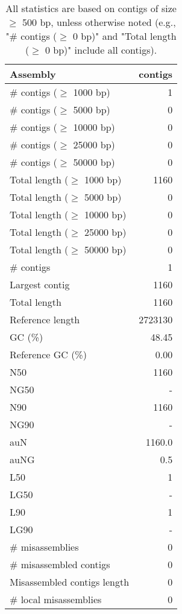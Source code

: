 \documentclass[12pt,a4paper]{article}
\begin{document}
\begin{table}[ht]
\begin{center}
\caption{All statistics are based on contigs of size $\geq$ 500 bp, unless otherwise noted (e.g., "\# contigs ($\geq$ 0 bp)" and "Total length ($\geq$ 0 bp)" include all contigs).}
\begin{tabular}{|l*{1}{|r}|}
\hline
Assembly & contigs \\ \hline
\# contigs ($\geq$ 1000 bp) & 1 \\ \hline
\# contigs ($\geq$ 5000 bp) & 0 \\ \hline
\# contigs ($\geq$ 10000 bp) & 0 \\ \hline
\# contigs ($\geq$ 25000 bp) & 0 \\ \hline
\# contigs ($\geq$ 50000 bp) & 0 \\ \hline
Total length ($\geq$ 1000 bp) & 1160 \\ \hline
Total length ($\geq$ 5000 bp) & 0 \\ \hline
Total length ($\geq$ 10000 bp) & 0 \\ \hline
Total length ($\geq$ 25000 bp) & 0 \\ \hline
Total length ($\geq$ 50000 bp) & 0 \\ \hline
\# contigs & 1 \\ \hline
Largest contig & 1160 \\ \hline
Total length & 1160 \\ \hline
Reference length & 2723130 \\ \hline
GC (\%) & 48.45 \\ \hline
Reference GC (\%) & 0.00 \\ \hline
N50 & 1160 \\ \hline
NG50 & - \\ \hline
N90 & 1160 \\ \hline
NG90 & - \\ \hline
auN & 1160.0 \\ \hline
auNG & 0.5 \\ \hline
L50 & 1 \\ \hline
LG50 & - \\ \hline
L90 & 1 \\ \hline
LG90 & - \\ \hline
\# misassemblies & 0 \\ \hline
\# misassembled contigs & 0 \\ \hline
Misassembled contigs length & 0 \\ \hline
\# local misassemblies & 0 \\ \hline

\end{tabular}
\end{center}
\end{table}
\end{document}
